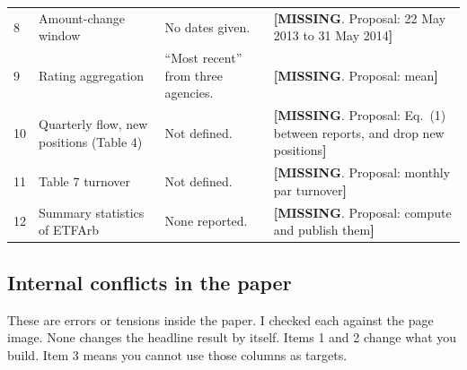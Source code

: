 \documentclass[10pt,a4paper]{article}
\newcommand{\MI}[1]{\textcolor{cmi}{\textbf{[MISSING}. Proposal: #1\textbf{]}}}
\begin{document}
\begin{longtable}{@{}P{0.5cm}P{4.8cm}P{5.4cm}P{5.8cm}@{}}
8 & Amount-change window & No dates given. & \MI{22 May 2013 to 31 May 2014}\\
9 & Rating aggregation & ``Most recent'' from three agencies. & \MI{mean}\\
10 & Quarterly flow, new positions (Table 4) & Not defined. & \MI{Eq.~(1) between reports, and drop new positions}\\
11 & Table 7 turnover & Not defined. & \MI{monthly par turnover}\\
12 & Summary statistics of ETFArb & None reported. & \MI{compute and publish them}\\
\bottomrule
\end{longtable}

\subsection{Internal conflicts in the paper}
These are errors or tensions inside the paper. I checked each against the page image. None changes the headline result by itself. Items 1 and 2 change what you build. Item 3 means you cannot use those columns as targets.
\end{document}
